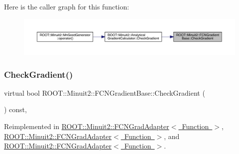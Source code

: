 Here is the caller graph for this function\+:
\nopagebreak
\begin{figure}[H]
\begin{center}
\leavevmode
\includegraphics[width=350pt]{d2/d53/classROOT_1_1Minuit2_1_1FCNGradientBase_ae69375c7506f0be6a1ab4e4e937ac555_icgraph}
\end{center}
\end{figure}
\mbox{\label{classROOT_1_1Minuit2_1_1FCNGradientBase_ae69375c7506f0be6a1ab4e4e937ac555}} 
\subsubsection{\texorpdfstring{CheckGradient()}{CheckGradient()}\hspace{0.1cm}{\footnotesize\ttfamily [2/3]}}
{\footnotesize\ttfamily virtual bool R\+O\+O\+T\+::\+Minuit2\+::\+F\+C\+N\+Gradient\+Base\+::\+Check\+Gradient (\begin{DoxyParamCaption}{ }\end{DoxyParamCaption}) const\hspace{0.3cm}{\ttfamily [inline]}, {\ttfamily [virtual]}}



Reimplemented in \mbox{\hyperlink{classROOT_1_1Minuit2_1_1FCNGradAdapter_a10faf0c868284a440f291465b7efd08e}{R\+O\+O\+T\+::\+Minuit2\+::\+F\+C\+N\+Grad\+Adapter$<$ Function $>$}}, \mbox{\hyperlink{classROOT_1_1Minuit2_1_1FCNGradAdapter_a10faf0c868284a440f291465b7efd08e}{R\+O\+O\+T\+::\+Minuit2\+::\+F\+C\+N\+Grad\+Adapter$<$ Function $>$}}, and \mbox{\hyperlink{classROOT_1_1Minuit2_1_1FCNGradAdapter_a10faf0c868284a440f291465b7efd08e}{R\+O\+O\+T\+::\+Minuit2\+::\+F\+C\+N\+Grad\+Adapter$<$ Function $>$}}.

\mbox{\label{classROOT_1_1Minuit2_1_1FCNGradientBase_ae69375c7506f0be6a1ab4e4e937ac555}} 
